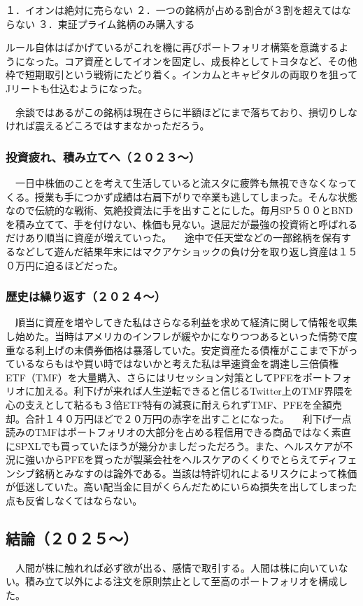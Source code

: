 １．イオンは絶対に売らない
２．一つの銘柄が占める割合が３割を超えてはならない
３．東証プライム銘柄のみ購入する

ルール自体はばかげているがこれを機に再びポートフォリオ構築を意識するようになった。コア資産としてイオンを固定し、成長枠としてトヨタなど、その他枠で短期取引という戦術にたどり着く。インカムとキャピタルの両取りを狙ってJリートも仕込むようになった。

　余談ではあるがこの銘柄は現在さらに半額ほどにまで落ちており、損切りしなければ震えるどころではすまなかっただろう。

\subsubsection{投資疲れ、積み立てへ（２０２３～）}
　一日中株価のことを考えて生活していると流スタに疲弊も無視できなくなってくる。授業も手につかず成績は右肩下がりで卒業も逃してしまった。そんな状態なので伝統的な戦術、気絶投資法に手を出すことにした。毎月SP５００とBNDを積み立てて、手を付けない、株価も見ない。退屈だが最強の投資術と呼ばれるだけあり順当に資産が増えていった。
　途中で任天堂などの一部銘柄を保有するなどして遊んだ結果年末にはマクアケショックの負け分を取り返し資産は１５０万円に迫るほどだった。

\subsubsection{歴史は繰り返す（２０２４～）}
　順当に資産を増やしてきた私はさらなる利益を求めて経済に関して情報を収集し始めた。当時はアメリカのインフレが緩やかになりつつあるといった情勢で度重なる利上げの末債券価格は暴落していた。安定資産たる債権がここまで下がっているならもはや買い時ではないかと考えた私は早速資金を調達し三倍債権ETF（TMF）を大量購入、さらにはリセッション対策としてPFEをポートフォリオに加える。利下げが来れば人生逆転できると信じるTwitter上のTMF界隈を心の支えとして粘るも３倍ETF特有の減衰に耐えられずTMF、PFEを全額売却。合計１４０万円ほどで２０万円の赤字を出すことになった。
　利下げ一点読みのTMFはポートフォリオの大部分を占める程信用できる商品ではなく素直にSPXLでも買っていたほうが幾分かましだっただろう。また、ヘルスケアが不況に強いからPFEを買ったが製薬会社をヘルスケアのくくりでとらえてディフェンシブ銘柄とみなすのは論外である。当該は特許切れによるリスクによって株価が低迷していた。高い配当金に目がくらんだためにいらぬ損失を出してしまった点も反省しなくてはならない。

\subsection{結論（２０２５～）}
　人間が株に触れれば必ず欲が出る、感情で取引する。人間は株に向いていない。積み立て以外による注文を原則禁止として至高のポートフォリオを構成した。

